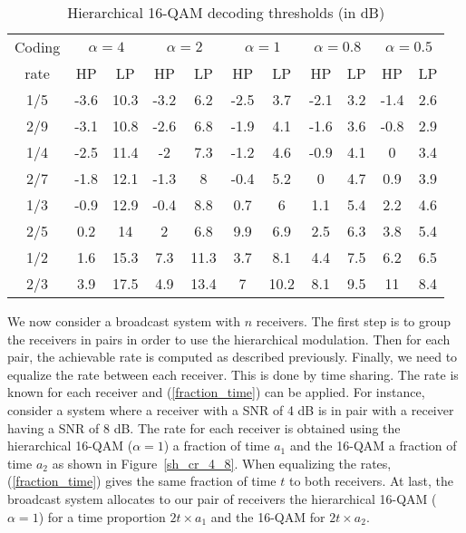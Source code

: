 \documentclass[conference, letterpaper]{IEEEtran}
\begin{document}
\begin{table}[!ht]
\renewcommand{\arraystretch}{1.1}
\setlength{\tabcolsep}{0.13cm}
\caption{Hierarchical 16-QAM decoding thresholds (in dB)}
\label{decoding_threshold}
\centering
\begin{tabular}{c||c|c|c|c|c|c|c|c|c|c} 
\hline
Coding & \multicolumn{2}{c|}{$\alpha=4$} & \multicolumn{2}{c|}{$\alpha=2$} & \multicolumn{2}{c|}{$\alpha=1$} &  \multicolumn{2}{c|}{$\alpha=0.8$} & \multicolumn{2}{c}{$\alpha=0.5$} \\ 
\cline{2-11}
rate & HP & LP & HP & LP & HP & LP & HP & LP & HP & LP \\
\hline
1/5 & -3.6 & 10.3 & -3.2 & 6.2 & -2.5 & 3.7 & -2.1 & 3.2 & -1.4 & 2.6 \\
\hline
2/9 & -3.1 & 10.8 & -2.6 & 6.8 & -1.9 & 4.1 & -1.6 & 3.6 & -0.8 & 2.9 \\
\hline 
1/4 & -2.5 & 11.4 & -2 & 7.3 & -1.2 & 4.6 & -0.9 & 4.1 & 0 & 3.4 \\
\hline 
2/7 & -1.8 & 12.1 & -1.3 & 8 & -0.4 & 5.2 & 0 & 4.7 & 0.9 & 3.9 \\
\hline 
1/3 & -0.9 & 12.9 & -0.4 & 8.8 & 0.7 & 6 & 1.1 & 5.4 & 2.2 & 4.6 \\
\hline 
2/5 & 0.2 & 14 & 2 & 6.8 & 9.9 & 6.9 & \cellcolor{Gray} 2.5 & 6.3 & \cellcolor{Gray} 3.8 & 5.4 \\
\hline 
1/2 & 1.6 & 15.3 & 7.3 & 11.3 & 3.7 & 8.1 & 4.4 & \cellcolor{Gray} 7.5 & 6.2 & \cellcolor{Gray} 6.5 \\
\hline 
2/3 & 3.9 & 17.5 & 4.9 & 13.4 & 7 & 10.2 & 8.1 & 9.5 & 11 & 8.4 \\
\hline   
\end{tabular}
\end{table}

We now consider a broadcast system with $n$ receivers. The first step is to group the receivers in pairs in order to use the hierarchical modulation. Then for each pair, the achievable rate is computed as described previously. Finally, we need to equalize the rate between each receiver. This is done by time sharing. The rate is known for each receiver and (\ref{fraction_time}) can be applied. For instance, consider a system where a receiver with a SNR of 4 dB is in pair with a receiver having a SNR of 8 dB. The rate for each receiver is obtained using the hierarchical 16-QAM ($\alpha=1$) a fraction of time $a_1$ and the 16-QAM a fraction of time $a_2$ as shown in Figure~\ref{sh_cr_4_8}. When equalizing the rates, (\ref{fraction_time}) gives the same fraction of time $t$ to both receivers. At last, the broadcast system allocates to our pair of receivers the hierarchical 16-QAM ($\alpha=1$) for a time proportion $2t \times a_1$ and the 16-QAM for $2t \times a_2$. 
\end{document}
